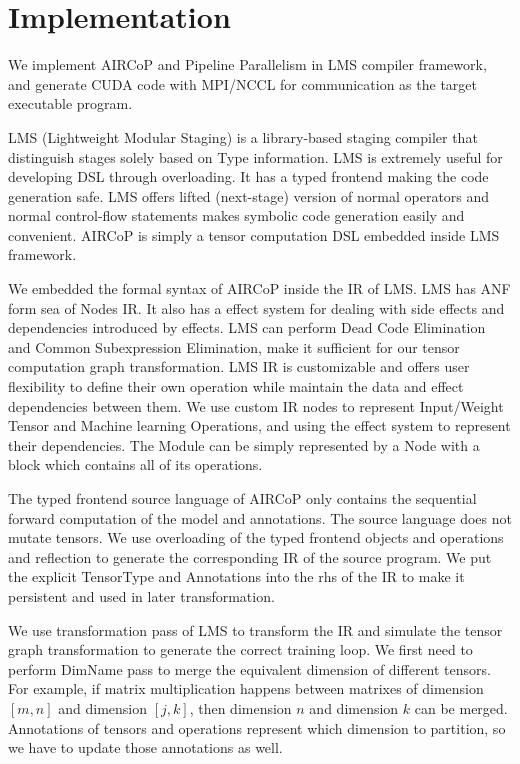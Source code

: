 \documentclass[sigplan]{acmart}\settopmatter{printfolios=true,printccs=false,printacmref=false}
\begin{document}
 \section{Implementation}
 We implement AIRCoP and Pipeline Parallelism in LMS compiler framework\cite{rompf2010lightweight}, and generate CUDA\cite{sanders2010cuda} code with MPI\cite{gropp1999using}/NCCL for communication as the target executable program.\par
  LMS (Lightweight Modular Staging) is a library-based staging compiler that distinguish stages solely based on Type information. LMS is extremely useful for developing DSL through overloading. It has a typed frontend making the code generation safe. LMS offers lifted (next-stage) version of normal operators and normal control-flow statements makes symbolic code generation easily and convenient. AIRCoP is simply a tensor computation DSL embedded inside LMS framework.\par
 We embedded the formal syntax of AIRCoP inside the IR of LMS. LMS has ANF\cite{flanagan1993essence} form sea of Nodes\cite{click1995simple} IR. It also has a effect system for dealing with side effects and dependencies introduced by effects. LMS can perform Dead Code Elimination and Common Subexpression Elimination, make it sufficient for our tensor computation graph transformation. LMS IR is customizable and offers user flexibility to define their own operation while maintain the data and effect dependencies between them. We use custom IR nodes to represent Input/Weight Tensor and Machine learning Operations, and using the effect system to represent their dependencies. The Module can be simply represented by a Node with a block which contains all of its operations. \par
 The typed frontend source language of AIRCoP only contains the sequential forward computation of the model and annotations. The source language does not mutate tensors. We use overloading of the typed frontend objects and operations and reflection to generate the corresponding IR of the source program. We put the explicit TensorType and Annotations into the rhs of the IR to make it persistent and used in later transformation. \par
 We use transformation pass of LMS to transform the IR and simulate the tensor graph transformation to generate the correct training loop. We first need to perform DimName pass to merge the equivalent dimension of different tensors. For example, if matrix multiplication happens between matrixes of dimension $[m, n]$ and dimension $[j,k]$, then dimension $n$ and dimension $k$ can be merged.  Annotations of tensors and operations represent which dimension to partition, so we have to update those annotations as well. \par
\end{document}
